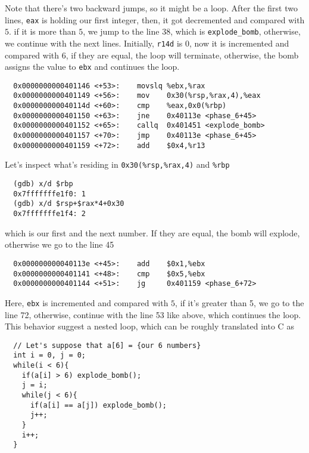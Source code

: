 Note that there's two backward jumps, so it might be a loop. After the first two lines, \verb+eax+ is holding our first integer, then, it got decremented and compared with $5$. if it is more than $5$, we jump to the line 38, which is \verb|explode_bomb|, otherwise, we continue with the next lines. Initially, \verb|r14d| is $0$, now it is incremented and compared with $6$, if they are equal, the loop will terminate, otherwise, the bomb assigns the value to \verb|ebx| and continues the loop.
{\renewcommand\fcolorbox[4][]{\textcolor{cyan}{\strut#4}}
\begin{verbatim}
  0x0000000000401146 <+53>:    movslq %ebx,%rax
  0x0000000000401149 <+56>:    mov    0x30(%rsp,%rax,4),%eax
  0x000000000040114d <+60>:    cmp    %eax,0x0(%rbp)
  0x0000000000401150 <+63>:    jne    0x40113e <phase_6+45>
  0x0000000000401152 <+65>:    callq  0x401451 <explode_bomb>
  0x0000000000401157 <+70>:    jmp    0x40113e <phase_6+45>
  0x0000000000401159 <+72>:    add    $0x4,%r13
\end{verbatim}
}\noindent
Let's inspect what's residing in \verb|0x30(%rsp,%rax,4)| and \verb|%rbp|
{\renewcommand\fcolorbox[4][]{\textcolor{black}{\strut#4}}
\begin{verbatim}
  (gdb) x/d $rbp
  0x7fffffffe1f0: 1
  (gdb) x/d $rsp+$rax*4+0x30
  0x7fffffffe1f4: 2
\end{verbatim}
}\noindent
which is our first and the next number. If they are equal, the bomb will explode, otherwise we go to the line 45
{\renewcommand\fcolorbox[4][]{\textcolor{cyan}{\strut#4}}
\begin{verbatim}
  0x000000000040113e <+45>:    add    $0x1,%ebx
  0x0000000000401141 <+48>:    cmp    $0x5,%ebx
  0x0000000000401144 <+51>:    jg     0x401159 <phase_6+72>
\end{verbatim}
}\noindent
Here, \verb|ebx| is incremented and compared with $5$, if it's greater than 5, we go to the line 72, otherwise, continue with the line 53 like above, which continues the loop.\\
This behavior suggest a nested loop, which can be roughly translated into C as
{\renewcommand\fcolorbox[4][]{\textcolor{black}{\strut#4}}
\begin{verbatim}
  // Let's suppose that a[6] = {our 6 numbers}
  int i = 0, j = 0;
  while(i < 6){
    if(a[i] > 6) explode_bomb();
    j = i;
    while(j < 6){
      if(a[i] == a[j]) explode_bomb();
      j++;
    }
    i++;
  }
\end{verbatim}
}\noindent
